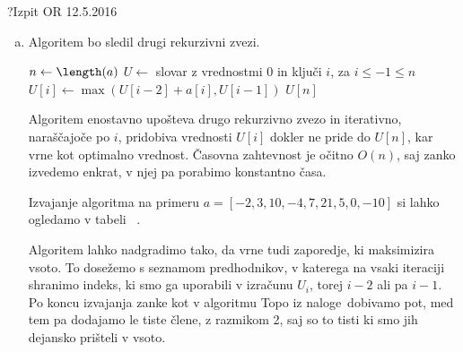 \begin{naloga}{?}{Izpit OR 12.5.2016}
\begin{odgovor}
\begin{enumerate}[(a)]
Ideja tega rekurzivnega zapisa je podobna zgornji,
le da se namesto iska\-nja maksimuma odloči,
če bo $i$-ti člen vključila v vsoto oziroma ga bo izpustila.

Vrstni red iskanja vrednosti $U_i$ določimo z naraščajočim zaporedjem indeksov $i$, ko $1\leq i \leq n$, 
saj imamo tako pred reševanjem problema $U_i$ definirane vse vrednosti prej.
Ko izračunamo vse vrednosti $U_i$, je maximum vsote zaporedja enak $U_n$,
kar sledi neposredno iz definicije vrednosti $U_n$.

\item Algoritem bo sledil drugi rekurzivni zvezi.

\begin{small}
\begin{algorithmic}
	\State $n \gets \length(a)$
	\State $U \gets$ slovar z vrednostmi $0$ in ključi $i$, za $i \leq -1 \leq n$
		\State $U[i] \gets \max(U[i-2] + a[i], U[i-1])$
	\EndFor
	\Return $U[n]$
\EndFunction
\end{algorithmic}
\end{small}

Algoritem enostavno upošteva drugo rekurzivno zvezo in iterativno, naraščajoče po $i$, pridobiva 
vrednosti $U[i]$ dokler ne pride do $U[n]$, kar vrne kot optimalno vrednost.
Časovna zahtevnost je očitno $O(n)$, saj zanko izvedemo enkrat, v njej pa porabimo konstantno časa.

Izvajanje algoritma na primeru $a = [-2, 3, 10, -4, 7, 21, 5, 0, -10]$ si lahko ogledamo v tabeli ~\tab.

Algoritem lahko nadgradimo tako, da vrne tudi zaporedje, ki maksimizira vsoto.
To dosežemo s seznamom predhodnikov, v katerega na vsaki iteraciji shranimo indeks, ki smo ga uporabili v izračunu $U_i$, torej $i-2$ ali pa $i-1$.
Po koncu  izvajanja zanke kot v algoritmu {\sc Topo} iz naloge~\res[topo] dobivamo pot, med tem pa dodajamo le tiste člene, z razmikom 2, 
saj so to tisti ki smo jih dejansko prišteli v vsoto.


\end{enumerate}
\end{odgovor}
\end{naloga}
